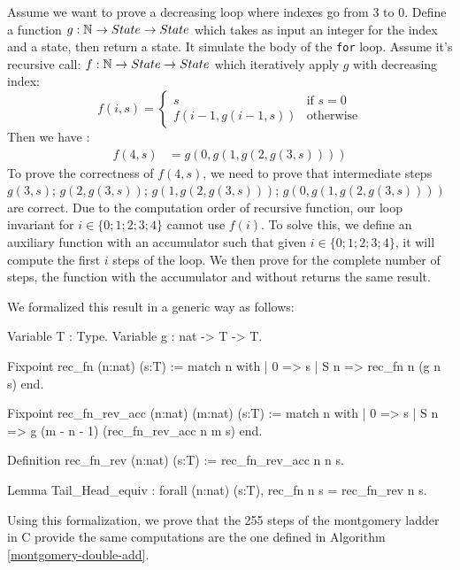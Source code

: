 Assume we want to prove a decreasing loop where indexes go from 3 to 0.
Define a function $g : \mathbb{N} \rightarrow State  \rightarrow State $ which takes as input an integer for the index and a state,
then return a state. It simulate the body of the \texttt{for} loop.
Assume it's recursive call: $f : \mathbb{N} \rightarrow State \rightarrow State $ which iteratively apply $g$ with decreasing index:
\begin{equation*}
  f ( i , s ) =
  \begin{cases}
  s & \text{if } s = 0 \\
  f( i - 1 , g ( i - 1  , s )) & \text{otherwise}
  \end{cases}
\end{equation*}
Then we have :
\begin{align*}
  f(4,s) &= g(0,g(1,g(2,g(3,s))))
\end{align*}
To prove the correctness of $f(4,s)$, we need to prove that intermediate steps
$g(3,s)$; $g(2,g(3,s))$; $g(1,g(2,g(3,s)))$; $g(0,g(1,g(2,g(3,s))))$ are correct.
Due to the computation order of recursive function, our loop invariant for $i\in\{0;1;2;3;4\}$ cannot use $f(i)$.
To solve this, we define an auxiliary function with an accumulator such that given $i\in\{0;1;2;3;4\}$, it will compute the first $i$ steps of the loop.
We then prove for the complete number of steps, the function with the accumulator and without returns the same result.

We formalized this result in a generic way as follows:
\begin{Coq}
Variable T : Type.
Variable g : nat -> T -> T.

Fixpoint rec_fn (n:nat) (s:T) :=
  match n with
  | 0 => s
  | S n => rec_fn n (g n s)
  end.

Fixpoint rec_fn_rev_acc (n:nat) (m:nat) (s:T) :=
  match n with
  | 0 => s
  | S n => g (m - n - 1) (rec_fn_rev_acc n m s)
  end.

Definition rec_fn_rev (n:nat) (s:T) :=
  rec_fn_rev_acc n n s.

Lemma Tail_Head_equiv :
  forall (n:nat) (s:T),
  rec_fn n s = rec_fn_rev n s.
\end{Coq}
Using this formalization, we prove that the 255 steps of the montgomery ladder in C provide the same computations are the one defined in Algorithm \ref{montgomery-double-add}.
